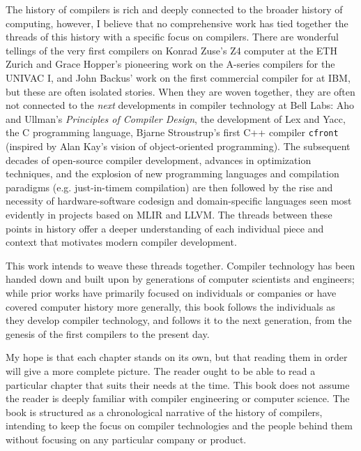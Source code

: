 
The history of compilers is rich and deeply connected to the broader history of computing,
however, I believe that no comprehensive work has tied together the threads of this history
with a specific focus on compilers.
There are wonderful tellings of the very first compilers on Konrad Zuse's Z4 computer at the ETH Zurich
and Grace Hopper's pioneering work on the A-series compilers for the UNIVAC I,
and John Backus' work on the first commercial compiler for \FTN{} at IBM,
but these are often isolated stories.
When they are woven together, they are often not connected to the
\textit{next} developments in compiler technology at Bell Labs:
Aho and Ullman's \textit{Principles of Compiler Design}, the development of Lex and Yacc,
the C programming language, Bjarne Stroustrup's first C++ compiler \texttt{cfront}
(inspired by Alan Kay's vision of object-oriented programming).
The subsequent decades of open-source compiler development, advances in optimization techniques,
and the explosion of new programming languages and compilation paradigms
(e.g. just-in-timem compilation) are then followed by the
rise and necessity of hardware-software codesign and domain-specific languages
seen most evidently in projects based on MLIR and LLVM.
The threads between these points in history offer a deeper understanding of
each individual piece and context that motivates modern compiler development.


This work intends to weave these threads together.
Compiler technology has been handed down and built upon by generations of computer scientists and engineers;
while prior works have primarily focused on individuals or companies or
have covered computer history more generally,
this book follows the individuals as they develop compiler technology,
and follows it to the next generation, from the genesis of the first compilers
to the present day.

My hope is that each chapter stands on its own, but that reading them in order will give a more complete picture.
The reader ought to be able to read a particular chapter that suits their needs at the time.
This book does not assume the reader is deeply familiar with compiler engineering or computer science.
The book is structured as a chronological narrative of the history of compilers,
intending to keep the focus on compiler technologies and the people behind them
without focusing on any particular company or product.
